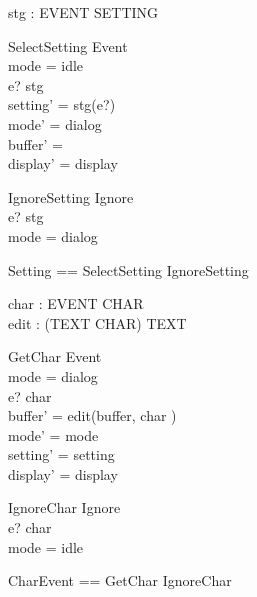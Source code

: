 \documentclass{llncs}
\begin{document}
\begin{axdef}
stg : EVENT \pfun SETTING
\end{axdef}
\begin{schema}{SelectSetting}
Event \\
\where mode = idle \\
e? \in \dom stg \\
setting' = stg(e?) \\
mode' = dialog \\
buffer' = \emptyset \\
display' = display
\end{schema}
\begin{schema}{IgnoreSetting}
Ignore \\
\where e? \in \dom stg \\
mode = dialog
\end{schema}
\begin{zed}
Setting == SelectSetting \lor IgnoreSetting
\end{zed}

\begin{axdef}
char : EVENT \pfun CHAR \\
edit : (TEXT \cross CHAR) \fun TEXT
\end{axdef}
\begin{schema}{GetChar}
Event \\
\where mode = dialog \\
e? \in \dom char \\
buffer' = edit(buffer, char ) \\
mode' = mode \\
setting' = setting \\
display' = display
\end{schema}
\begin{schema}{IgnoreChar}
Ignore \\
\where e? \in \dom char \\
mode = idle
\end{schema}
\begin{zed}
CharEvent == GetChar \lor IgnoreChar
\end{zed}
\end{document}
